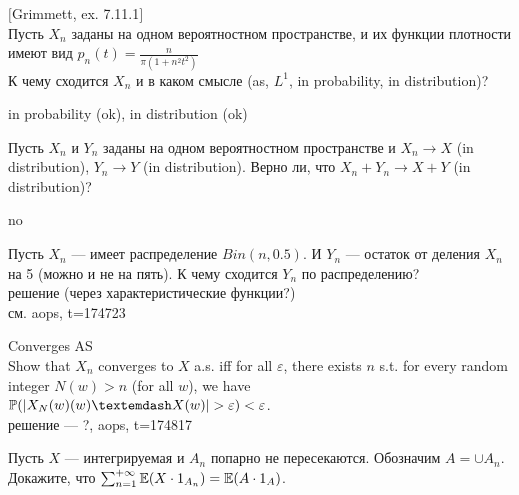 \begin{problem}
$[$Grimmett, ex. 7.11.1$]$ \\
Пусть $X_{n}$ заданы на одном вероятностном пространстве, и их
функции плотности имеют вид
$p_{n}(t)=\frac{n}{\pi(1+n^{2}t^{2})}$ \\
К чему сходится $X_{n}$ и в каком смысле (as, $L^{1}$, in
probability, in distribution)?

\begin{sol}

in probability (ok), in distribution (ok)
\end{sol}
\end{problem}

\begin{problem}
Пусть $X_{n}$ и $Y_{n}$ заданы на одном вероятностном пространстве
и $X_{n}\rightarrow X$ (in distribution), $Y_{n}\rightarrow Y$ (in
distribution). Верно ли, что $X_{n}+Y_{n}\rightarrow X+Y$ (in
distribution)?

\begin{sol}
no
\end{sol}
\end{problem}

\begin{problem}
Пусть $X_{n}$ — имеет распределение $Bin(n,0.5)$. И $Y_{n}$ — остаток от деления $X_{n}$ на 5 (можно и не на пять). К чему сходится $Y_{n}$ по распределению? \\
решение (через характеристические функции?) \\
см. aops, t=174723

\begin{sol}

\end{sol}
\end{problem}

\begin{problem}
Converges AS\\
Show that $X_{n}$ converges to $X$ a.s. iff for all $\varepsilon$, there exists $n$ s.t. for every random integer $N(w)>n$ (for all $w$), we have $\P(|X_N(w) (w) — X (w)| > \varepsilon) <\varepsilon$.\\
решение — ?, aops, t=174817

\begin{sol}

\end{sol}
\end{problem}

\begin{problem}
Пусть $X$ — интегрируемая и $A_{n}$ попарно не пересекаются.
Обозначим $A=\cup A_{n}$. Докажите, что
$\sum_{n=1}^{+\infty}\mathbb{E}(X\cdot 1_{A_{n}})=\mathbb{E}(A\cdot 1_{A})$.

\begin{sol}

\end{sol}
\end{problem}

